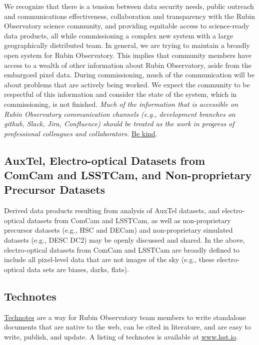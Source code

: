 \documentclass[SE,authoryear,toc]{lsstdoc}
\begin{document}
\begin{note}[Be Kind]
We recognize that there is a tension between data security needs, public outreach and communications effectiveness, collaboration and transparency with the Rubin Observatory science community, and providing equitable access to science-ready data products, all while commissioning a complex new system with a large geographically distributed team.
In general, we are trying to maintain a broadly open system for Rubin Observatory.
This implies that community members have access to a wealth of other information about Rubin Observatory, aside from the embargoed pixel data.
During commissioning, much of the communication will be about problems that are actively being worked.
We expect the community to be respectful of this information and consider the state of the system, which in commissioning, is not finished.
\textit{Much of the information that is accessible on Rubin Observatory communication channels (e.g., development branches on github, Slack, Jira, Confluence) should be treated as the work in progress of professional colleagues and collaborators.}
\href{https://www.lsst.org/about/dei/kindness}{Be kind}.
\end{note}

\subsection{AuxTel, Electro-optical Datasets from ComCam and LSSTCam, and Non-proprietary Precursor Datasets}

Derived data products resulting from analysis of AuxTel datasets, and electro-optical datasets from ComCam and LSSTCam, as well as non-proprietary precursor datasets (e.g., HSC and DECam) and non-proprietary simulated datasets (e.g., DESC DC2) may be openly discussed and shared.
In the above, electro-optical datasets from ComCam and LSSTCam are broadly defined to include all pixel-level data that are not images of the sky (e.g., these electro-optical data sets are biases, darks, flats).

\subsection{Technotes}
\label{technotes}

\href{https://developer.lsst.io/project-docs/technotes.html}{Technotes} are a way for Rubin Observatory team members to write standalone documents that are native to the web, can be cited in literature, and are easy to write, publish, and update.
A listing of technotes is available at \url{www.lsst.io}.
\end{document}
